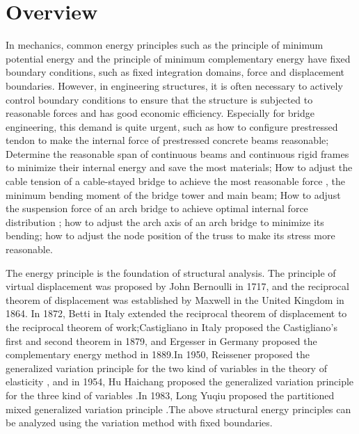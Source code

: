 \section {Overview}
In mechanics, common energy principles such as the principle of minimum potential energy and the principle of minimum complementary energy have fixed boundary conditions, such as fixed integration domains, force and displacement boundaries. However, in engineering structures, it is often necessary to actively control boundary conditions to ensure that the structure is subjected to reasonable forces and has good economic efficiency. Especially for bridge engineering, this demand is quite urgent, such as how to configure prestressed tendon to make the internal force of prestressed concrete beams reasonable; Determine the reasonable span of continuous beams and continuous rigid frames \cite{wayajun2016, daigonglian2015} to minimize their internal energy and save the most materials; How to adjust the cable tension of a cable-stayed bridge to achieve the most reasonable force \cite{daijie2019, zhouyungang2017,xiaorucheng1998}, the minimum bending moment of the bridge tower and main beam; How to adjust the suspension force of an arch bridge to achieve optimal internal force distribution \cite{liuzhao2009, fujinlong2014}; how to adjust the arch axis of an arch bridge to minimize its bending; how to adjust the node position of the truss to make its stress more reasonable.

The energy principle is the foundation of structural analysis. The principle of virtual displacement was proposed by John Bernoulli in 1717, and the reciprocal theorem of displacement was established by Maxwell in the United Kingdom in 1864. In 1872, Betti in Italy extended the reciprocal theorem of displacement to the reciprocal theorem of work;Castigliano in Italy proposed the Castigliano's first and second theorem in 1879, and Ergesser in Germany proposed the complementary energy method in 1889.In 1950, Reissener proposed the generalized variation principle for the two kind of variables in the theory of elasticity \cite{qianfeng2022}, and in 1954, Hu Haichang proposed the generalized variation principle for the three kind of variables \cite{huhaichang1954}.In 1983, Long Yuqiu proposed the partitioned mixed generalized variation principle \cite{longyuqiu1983}.The above structural energy principles can be analyzed using the variation method with fixed boundaries.

